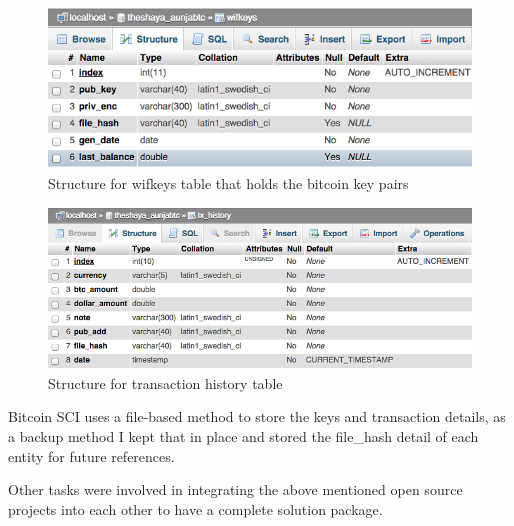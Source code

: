 \begin{figure}[htb]
\centering
\includegraphics[scale=0.5]{fig/wifkeys_table.png}
  \caption{Structure for wifkeys table that holds the bitcoin key pairs}
\label{fig:wifkeys}
\end{figure}

\begin{figure}[htb]
\centering
\includegraphics[scale=0.5]{fig/tx_history_table.png}
  \caption{Structure for transaction history table}
\label{fig:tx_history}
\end{figure}

Bitcoin SCI uses a file-based method to store the keys and transaction details, as a backup method I kept that in place and stored the file_hash detail of each entity for future references.

Other tasks were involved in integrating the above mentioned open source projects into each other to have a complete solution package.

